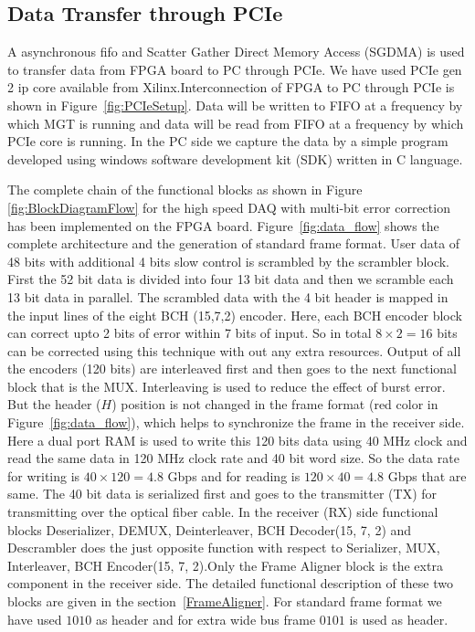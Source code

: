 \documentclass[10pt, conference, compsocconf]{IEEEtran}
\begin{document}
\subsection{Data Transfer through PCIe}
A asynchronous fifo and Scatter Gather Direct Memory Access (SGDMA) is used to transfer data from FPGA board to PC through PCIe. We have used PCIe gen 2 ip core available from Xilinx.Interconnection of FPGA to PC through PCIe is shown in Figure~\ref{fig:PCIeSetup}. Data will be written to FIFO at a frequency by which MGT is running and  data will be read from FIFO at a frequency by which PCIe core is running. In the PC side we capture the data by a simple program developed using windows software development kit (SDK) written in C language.  

\par
 The complete chain of the functional blocks as shown in Figure~ \ref{fig:BlockDiagramFlow} for the high speed DAQ with multi-bit error correction  has been implemented on the FPGA board. Figure~\ref{fig:data_flow} shows the complete architecture and the generation of standard frame format. User data of 48 bits with additional 4 bits slow control is scrambled by the scrambler block. First the 52 bit data is divided into four 13 bit data and then we scramble each 13 bit data in parallel. The scrambled data with the 4 bit header is mapped in the input lines of the eight BCH (15,7,2) encoder. Here, each BCH encoder block can correct upto 2 bits of error within 7 bits of input. So in total  $8\times 2 = 16$  bits can be corrected using this technique with out any extra resources. Output of all the encoders (120 bits) are interleaved first and then goes to the next functional block that is the MUX. Interleaving is used to reduce the effect of burst error. But the header ($H$) position is not changed in the frame format (red color in Figure~\ref{fig:data_flow}), which helps to synchronize the frame in the receiver side. Here a dual port RAM is used to write this 120 bits data using 40 MHz clock and read the same data in 120 MHz clock rate and 40 bit word size. So the data rate  for writing is $40 \times 120= 4.8 $ Gbps  and for reading is $120\times 40=4.8$ Gbps that are same. The 40 bit data is serialized first and goes to the transmitter (TX) for transmitting over the optical fiber cable. In the receiver (RX) side functional blocks Deserializer, DEMUX, Deinterleaver, BCH Decoder(15, 7, 2) and Descrambler does the just opposite function with respect to Serializer, MUX, Interleaver, BCH Encoder(15, 7, 2).Only the Frame Aligner block is the extra component in the receiver side.  The detailed functional description of these two blocks are given in  the section~\ref{FrameAligner}. For standard frame format we have used $1010$ as header and for extra wide bus frame $0101$ is used as header. 
\end{document}
